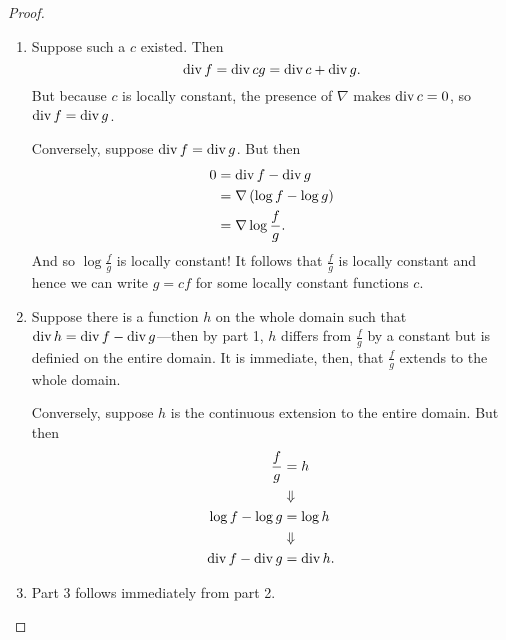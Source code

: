 \begin{proof} \phantom{hello world}
\begin{enumerate}
  \item Suppose such a \(c\) existed. Then
        \[
          \operatorname{div} f = \operatorname{div} cg = \operatorname{div} c + \operatorname{div} g.
        \]
        But because \(c\) is locally constant, the presence of \(\nabla\) makes
        \(\operatorname{div} c =0\), so \(\operatorname{div} f = \operatorname{div} g\).

        Conversely, suppose \(\operatorname{div} f = \operatorname{div} g\). But then
        \begin{align*}
          0 &= \operatorname{div} f - \operatorname{div} g\\
            &= \nabla \left( \log f - \log g \right) \\
          &= \nabla\log \frac{f}{g}.
        \end{align*}
        And so \(\log  \frac{f}{g}\) is locally constant! It follows that
        \(\frac{f}{g} \) is locally constant and hence we can write \(g=cf\) for
        some locally constant functions \(c\).

  \item Suppose there is a function \(h\) on the whole domain such that
        \(\operatorname{div} h = \operatorname{div} f - \operatorname{div} g\)---then by part 1, \(h\) differs from
        \(\frac{f}{g}\) by a constant but is definied on the entire domain. It
        is immediate, then, that \(\frac{f}{g}\) extends to the whole domain.

        Conversely, suppose \(h\) is the continuous extension to the entire
        domain. But then
        \begin{align*}
          \frac{f}{g} &= h \\
               & \Downarrow \\
          \log f - \log g &= \log h \\
               & \Downarrow \\
          \operatorname{div} f - \operatorname{div} g &= \operatorname{div} h.
        \end{align*}
  \item Part 3 follows immediately from part 2.
\end{enumerate}
\end{proof}

